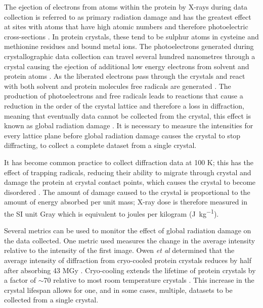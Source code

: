 The ejection of electrons from atoms within the protein by X-rays during  data collection is referred to as primary radiation damage and has the greatest effect at sites with atoms that have high atomic numbers and therefore photoelectric cross-sections \cite{Holton2009}. In protein crystals, these tend to be sulphur atoms in cysteine and methionine residues and bound metal ions. The photoelectrons generated during crystallographic data collection can travel several hundred nanometres through a crystal causing the ejection of additional low energy electrons from solvent and protein atoms \cite{Sanishvili2011,Cowan2008}. As the liberated electrons pass through the crystals and react with both solvent and protein molecules free radicals are generated \cite{Garman2010}. The production of photoelectrons and free radicals leads to reactions that cause a reduction in the order of the crystal lattice and therefore a loss in diffraction, meaning that eventually data cannot be collected from the crystal, this effect is known as global radiation damage \cite{Garman2010}. It is necessary to measure the intensities for every lattice plane before global radiation damage causes the crystal to stop diffracting, to collect a complete dataset from a single crystal. \par  

It has become common practice to collect diffraction data at 100 \si{\kelvin}; this has the effect of trapping radicals, reducing their ability to migrate through crystal and damage the protein at crystal contact points, which causes the crystal to become disordered \cite{Garman2010}. The amount of damage caused to the crystal is proportional to the amount of energy absorbed per unit mass; X-ray dose is therefore measured in the SI unit Gray which is equivalent to joules per kilogram (\si{\joule\per\kilo\gram}). 

Several metrics can be used to monitor the effect of global radiation damage on the data collected. One metric used measures the change in the average intensity relative to the intensity of the first image. Owen \textit{et al} determined that the average intensity of diffraction from cryo-cooled protein crystals reduces by half after absorbing 43 \si{\mega\gray} \cite{Owen2006}. Cryo-cooling extends the lifetime of protein crystals by a factor of $\sim$70 relative to most room temperature crystals \cite{Nave2005}. This increase in the crystal lifespan allows for one, and in some cases, multiple, datasets to be collected from a single crystal. \par

